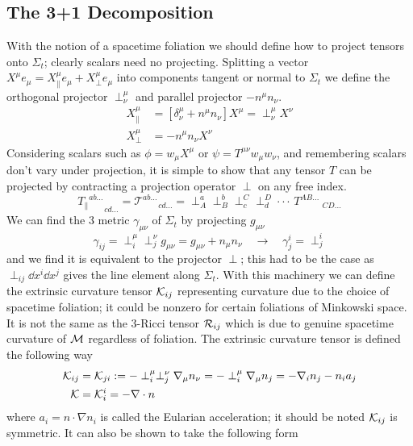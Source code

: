 \subsection{The 3+1 Decomposition}
With the notion of a spacetime foliation we should define how to project tensors onto $\Sigma_t$; clearly scalars need no projecting. Splitting a vector $X^\mu e_\mu = X^\mu_\| e_\mu + X^\mu_\perp e_\mu$ into components tangent or normal to $\Sigma_t$ we define the orthogonal projector $\perp^\mu_\nu$ and parallel projector $-n^\mu n_\nu$.
\begin{align}X^\mu_\| &= \left[ \delta^\mu_\nu + n^\mu n_\nu\right] X^\mu  = \perp^\mu_\nu X^\nu\\
X^\mu_\perp &= -n^\mu n_\nu X^\nu \end{align}
Considering scalars such as $\phi = w_\mu X^\mu$ or $\psi = T^{\mu\nu}w_\mu w_\nu$, and remembering scalars don't vary under projection, it is simple to show that any tensor $T$ can be projected by contracting a projection operator $\perp$ on any free index.
\begin{equation} {T_\|}^{ab ...}_{\;\;\;\;\;\;\;cd ...} = {\mathcal{T}}^{ab ...}_{\;\;\;\;\;\;\;cd ...} =\perp^{a}_{A}\perp^{b}_{B}\perp^{C}_{c}\perp^{D}_{d}\cdot\cdot\cdot\, T^{AB ...}_{\;\;\;\;\;\;\;\;\;\;CD ...}\end{equation}
We can find the 3 metric $\gamma_{\mu\nu}$ of $\Sigma_t$ by projecting $g_{\mu\nu}$ 
\begin{equation} \gamma_{ij} = \perp^\mu_i \perp^\nu_j g_{\mu\nu} = g_{\mu\nu} + n_\mu n_\nu\quad \rightarrow \quad \gamma^i_j = \perp^i_j\end{equation}
and we find it is equivalent to the projector $\perp$; this had to be the case as $\perp_{ij}\dd x^i\dd x^j$ gives the line element along $\Sigma_t$. With this machinery we can define the extrinsic curvature tensor $\mathcal{K}_{ij}$ representing curvature due to the choice of spacetime foliation; it could be nonzero for certain foliations of Minkowski space. It is not the same as the 3-Ricci tensor $\mathcal{R}_{ij}$ which is due to genuine spacetime curvature of $\mathcal{M}$ regardless of foliation. The extrinsic curvature tensor is defined the following way
\begin{align} \mathcal{K}_{ij}  &= \mathcal{K}_{ji}:= -\perp_i^\mu \perp_j^\nu \nabla_\mu n_\nu = -\perp_i^\mu \nabla_\mu n_j = -\nabla_i n_j - n_i a_j \\
\mathcal{K} &= \mathcal{K}_i^i = -\nabla \cdot n\end{align}
where $a_i = n\cdot\nabla n_i $ is called the Eularian acceleration; it should be noted $\mathcal{K}_{ij}$ is symmetric. It can also be shown to take the following form
